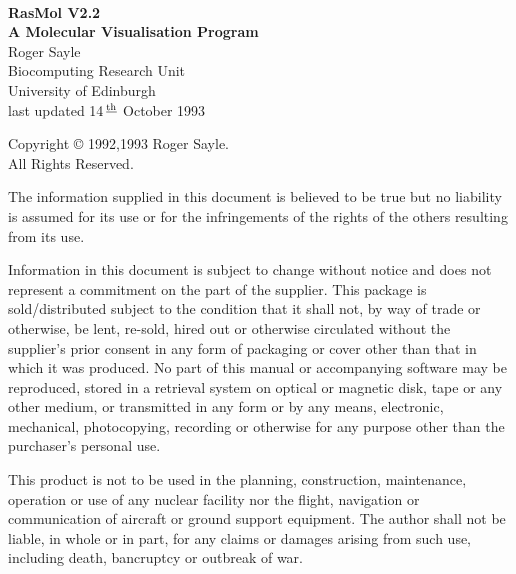 %

\makeindex

\newcommand{\up}[1]{\,$^{\underline{\hbox{\scriptsize\rm #1}}}$}
\setlength{\parindent}{0pt}
\setlength{\parskip}{2ex}



\begin{center}
\mbox{}\vspace{3in} \\
{\huge\bf RasMol V2.2} \\
\vspace{2ex}
{\Large\bf A Molecular Visualisation Program} \\
\vspace{3ex}
\large
Roger Sayle \\
Biocomputing Research Unit \\
University of Edinburgh \\
\vspace{3ex}
\normalsize
last updated 14\up{th} October 1993
\end{center}
\newpage


\small
\mbox{}\vfill
Copyright \copyright{} 1992,1993 Roger Sayle. \\
All Rights Reserved.

The information supplied in this document is believed to be true but
no liability is assumed for its use or for the infringements of the
rights of the others resulting from its use.

Information in this document is subject to change without notice and does
not represent a commitment on the part of the supplier. This package is
sold/distributed subject to the condition that it shall not, by way of
trade or otherwise, be lent, re-sold, hired out or otherwise circulated
without the supplier's prior consent in any form of packaging or cover
other than that in which it was produced. No part of this manual or
accompanying software may be reproduced, stored in a retrieval system on
optical or magnetic disk, tape or any other medium, or transmitted in any
form or by any means, electronic, mechanical, photocopying, recording or
otherwise for any purpose other than the purchaser's personal use.

This product is not to be used in the planning, construction, maintenance,
operation or use of any nuclear facility nor the flight, navigation or
communication of aircraft or ground support equipment. The author shall
not be liable, in whole or in part, for any claims or damages arising
from such use, including death, bancruptcy or outbreak of war.

